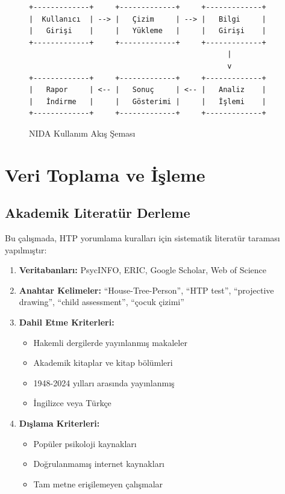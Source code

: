\begin{figure}[h!]
\centering
\begin{tcolorbox}[colback=gray!5, colframe=gray!75, width=0.9\textwidth]
\begin{verbatim}
+-------------+     +-------------+     +-------------+
|  Kullanıcı  | --> |   Çizim     | --> |   Bilgi     |
|   Girişi    |     |   Yükleme   |     |   Girişi    |
+-------------+     +-------------+     +-------------+
                                              |
                                              v
+-------------+     +-------------+     +-------------+
|   Rapor     | <-- |   Sonuç     | <-- |   Analiz    |
|   İndirme   |     |   Gösterimi |     |   İşlemi    |
+-------------+     +-------------+     +-------------+
\end{verbatim}
\end{tcolorbox}
\caption{NIDA Kullanım Akış Şeması}
\label{fig:akis}
\end{figure}

\section{Veri Toplama ve İşleme}

\subsection{Akademik Literatür Derleme}

Bu çalışmada, HTP yorumlama kuralları için sistematik literatür taraması yapılmıştır:

\begin{enumerate}
  \item \textbf{Veritabanları:} PsycINFO, ERIC, Google Scholar, Web of Science
  \item \textbf{Anahtar Kelimeler:} ``House-Tree-Person'', ``HTP test'', ``projective drawing'', ``child assessment'', ``çocuk çizimi''
  \item \textbf{Dahil Etme Kriterleri:}
  \begin{itemize}
    \item Hakemli dergilerde yayınlanmış makaleler
    \item Akademik kitaplar ve kitap bölümleri
    \item 1948-2024 yılları arasında yayınlanmış
    \item İngilizce veya Türkçe
  \end{itemize}
  \item \textbf{Dışlama Kriterleri:}
  \begin{itemize}
    \item Popüler psikoloji kaynakları
    \item Doğrulanmamış internet kaynakları
    \item Tam metne erişilemeyen çalışmalar
  \end{itemize}
\end{enumerate}

